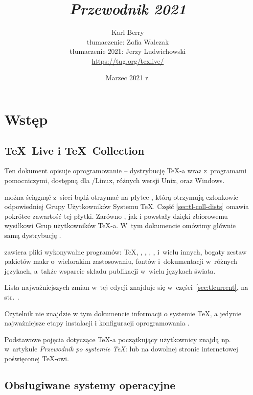 \documentclass{article}
\title{%
 {\huge \textit{Przewodnik \protect\TL{} 2021}}
}
\author{Karl Berry\\[2mm]
 tłumaczenie: Zofia Walczak\\[2mm]
 tłumaczenie 2021: Jerzy Ludwichowski\\[3mm]
 \url{https://tug.org/texlive/}
}
\date{Marzec 2021 r.}
\begin{document}
\maketitle

\begin{multicols}{2}
\tableofcontents
\end{multicols}
\section{Wstęp}\label{sec:intro}

\subsection{\protect\TeX\protect\ Live i \protect\TeX\protect\ Collection}
Ten dokument  opisuje oprogramowanie \TL{} --
dystrybucję \TeX-a wraz z~programami pomocniczymi, dostępną dla \GNU/Linux,
różnych wersji Unix, \MacOSX oraz Windows.

\TL{} można ściągnąć z~sieci bądź otrzymać na płytce \DVD \TK{}, którą otrzymują członkowie odpowiedniej Grupy Użytkowników Systemu \TeX{}.
Część \ref{sec:tl-coll-dists} omawia pokrótce zawartość tej płytki.
Zarówno \TL{}, jak i \TK{} powstały dzięki zbiorowemu wysiłkowi Grup użytkowników \TeX-a.
W~tym dokumencie omówimy głównie samą dystrybucję \TL.

\TL{} zawiera pliki wykonywalne programów: \TeX{}, \LaTeXe{}, \ConTeXt,
\MF, \MP, \BibTeX{}
 i~wielu innych,  bogaty zestaw pakietów makr o~wielorakim
zastosowaniu,   fontów i~dokumentacji w~różnych językach, a~także  wsparcie składu
publikacji w~wielu językach świata.

Lista najważniejszych zmian w~tej edycji \TL{}
znajduje się w~części~\ref{sec:tlcurrent}, na str.~\pageref{sec:tlcurrent}.

Czytelnik nie znajdzie w tym dokumencie informacji o systemie \TeX{}, a jedynie najważniejsze etapy instalacji i konfiguracji oprogramowania \TL.


Podstawowe pojęcia dotyczące \TeX-a początkujący użytkownicy znajdą
np. w~artykule {\it Przewodnik po systemie \TeX\/}:
 lub na dowolnej stronie internetowej poświęconej \TeX-owi.

\subsection{Obsługiwane systemy operacyjne}
\label{sec:os_support}
\end{document}
